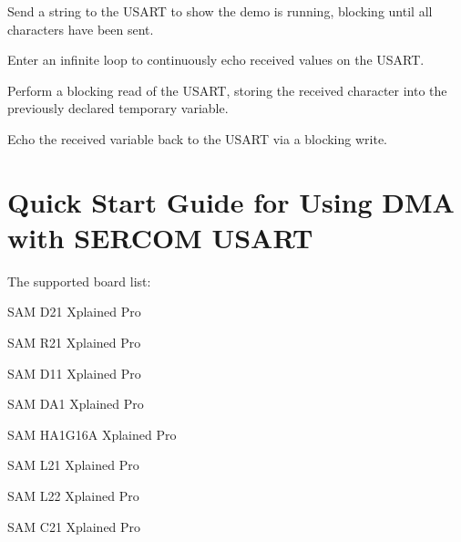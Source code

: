 \begin{DoxyEnumerate}
\item Send a string to the U\+S\+A\+R\+T to show the demo is running, blocking until all characters have been sent. 
\begin{DoxyCodeInclude}
\end{DoxyCodeInclude}

\item Enter an infinite loop to continuously echo received values on the U\+S\+A\+R\+T. 
\begin{DoxyCodeInclude}
\end{DoxyCodeInclude}

\item Perform a blocking read of the U\+S\+A\+R\+T, storing the received character into the previously declared temporary variable. 
\begin{DoxyCodeInclude}
\end{DoxyCodeInclude}

\item Echo the received variable back to the U\+S\+A\+R\+T via a blocking write. 
\begin{DoxyCodeInclude}
\end{DoxyCodeInclude}

\end{DoxyEnumerate}\hypertarget{asfdoc_sam0_sercom_usart_dma_use_case}{}\section{Quick Start Guide for Using D\+M\+A with S\+E\+R\+C\+O\+M U\+S\+A\+R\+T}\label{asfdoc_sam0_sercom_usart_dma_use_case}
The supported board list\+:
\begin{DoxyItemize}
\item S\+A\+M D21 Xplained Pro
\item S\+A\+M R21 Xplained Pro
\item S\+A\+M D11 Xplained Pro
\item S\+A\+M D\+A1 Xplained Pro
\item S\+A\+M H\+A1\+G16\+A Xplained Pro
\item S\+A\+M L21 Xplained Pro
\item S\+A\+M L22 Xplained Pro
\item S\+A\+M C21 Xplained Pro
\end{DoxyItemize}


